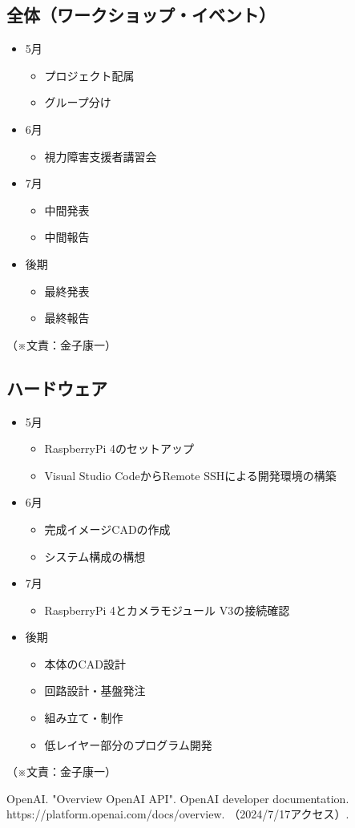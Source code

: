 \documentclass[11pt,a4paper]{report}
\newcommand{\Writer}[1]{
  \normalsize
  \begin{flushright}
    （※文責：#1）
  \end{flushright}
}
\begin{document}
\subsection{全体（ワークショップ・イベント）}
\noindent\space
\begin{itemize}
  \item 5月
  \begin{itemize}
    \item プロジェクト配属
    \item グループ分け
  \end{itemize}
  \item 6月
  \begin{itemize}
    \item 視力障害支援者講習会
  \end{itemize}
  \item 7月
  \begin{itemize}
    \item 中間発表
    \item 中間報告
  \end{itemize}
  \item 後期
  \begin{itemize}
    \item 最終発表
    \item 最終報告
  \end{itemize}
\end{itemize}
\Writer{金子康一}

\subsection{ハードウェア}
\noindent\space
\begin{itemize}
  \item 5月
  \begin{itemize}
    \item RaspberryPi 4のセットアップ
    \item Visual Studio CodeからRemote SSHによる開発環境の構築
  \end{itemize}
  \item 6月
  \begin{itemize}
    \item 完成イメージCADの作成
    \item システム構成の構想
  \end{itemize}
  \item 7月
  \begin{itemize}
    \item RaspberryPi 4とカメラモジュール V3の接続確認
  \end{itemize}
  \item 後期
  \begin{itemize}
    \item 本体のCAD設計
    \item 回路設計・基盤発注
    \item 組み立て・制作
    \item 低レイヤー部分のプログラム開発
  \end{itemize}
\end{itemize}
\Writer{金子康一}

\newpage
{}
\begin{thebibliography}{1}
   OpenAI. "Overview OpenAI API". OpenAI developer documentation. https://platform.openai.com/docs/overview. （2024/7/17アクセス）.
\end{thebibliography}
\end{document}
